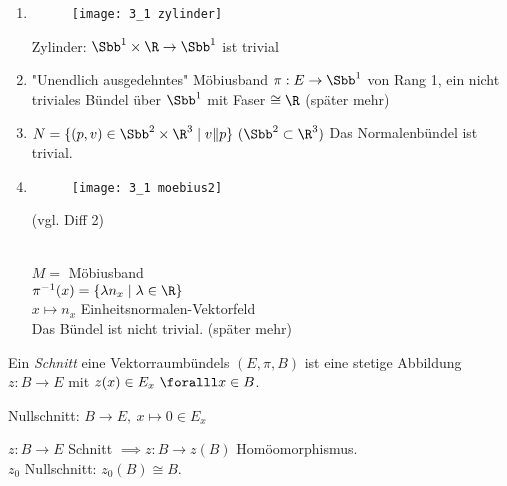\begin{exmp*}
	\begin{enumerate}[label = {\roman*})]
		\item \begin{minipage}{\linewidth}
			\begin{wrapfigure}{R}{2cm}
				\centering
				\texttt{[image: 3\_1 zylinder]}
			\end{wrapfigure}
			
			Zylinder: $ \Sbb^1 \times \R \to \Sbb^1 $ ist trivial
		\end{minipage}
		\item "Unendlich ausgedehntes" Möbiusband  $ \pi: E \to \Sbb^1 $ von Rang 1, ein nicht triviales Bündel über $\Sbb^1$ mit Faser $\cong \R$ (später mehr)
		\item $ N = \{(p,v) \in \Sbb^2 \times \R^3 \mid v \| p\}\ (\Sbb^2 \subset \R^3) $
			Das Normalenbündel ist trivial.
		\item \begin{minipage}{\linewidth}
				\begin{wrapfigure}{R}{5cm}
					\centering
					\texttt{[image: 3\_1 moebius2]}
				\end{wrapfigure}
				(vgl. Diff 2)
			\end{minipage} \\
			$ M = $ Möbiusband\\
			$ \pi^{-1}(x) = \{\lambda n_x \mid \lambda \in \R\} $\\
			$ x \mapsto n_x$ Einheitsnormalen-Vektorfeld\\
			Das Bündel ist nicht trivial. (später mehr)
	\end{enumerate}
\end{exmp*}

\begin{defn}[Schnitt]
	Ein \emph{Schnitt} eine Vektorraumbündels $ (E,\pi,B) $ ist eine stetige Abbildung $ z: B \to E $ mit $z(x) \in E_x\ \foralll x \in B$.
\end{defn}
	
\begin{exmp*}
	Nullschnitt: $ B \to E,\ x \mapsto 0 \in E_x $
\end{exmp*}

\begin{rem*}
	$ z: B \to E $ Schnitt $ \implies z: B \to z(B) $ Homöomorphismus.\\
	$z_0$ Nullschnitt: $z_0(B) \cong B$.
\end{rem*}

